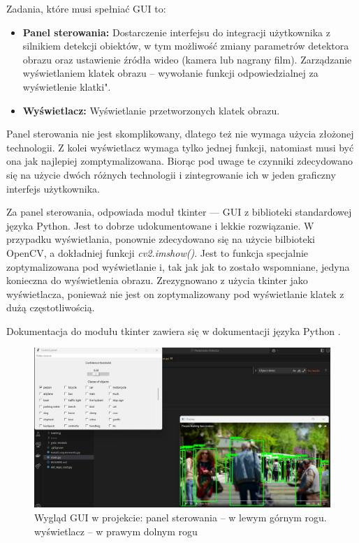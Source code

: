 Zadania, które musi spełniać GUI to:
\begin{itemize}
    \item \textbf{Panel sterowania:} Dostarczenie interfejsu do integracji użytkownika z silnikiem detekcji obiektów, w tym możliwość zmiany parametrów detektora obrazu oraz ustawienie źródła wideo (kamera lub nagrany film). Zarządzanie wyświetlaniem klatek obrazu -- wywołanie funkcji odpowiedzialnej za wyświetlenie klatki".
    \item \textbf{Wyświetlacz: } Wyświetlanie przetworzonych klatek obrazu.
\end{itemize}

Panel sterowania nie jest skomplikowany, dlatego też nie wymaga użycia złożonej technologii. Z kolei wyświetlacz wymaga tylko jednej funkcji, natomiast musi być ona jak najlepiej zomptymalizowana. Biorąc pod uwage te czynniki zdecydowano się na użycie dwóch różnych technologii i zintegrowanie ich w jeden graficzny interfejs użytkownika.

Za panel sterowania, odpowiada moduł tkinter --- GUI z biblioteki standardowej języka Python. Jest to dobrze udokumentowane i lekkie rozwiązanie. W przypadku wyświetlania, ponownie zdecydowano się na użycie bilbioteki OpenCV, a dokładniej funkcji \emph{cv2.imshow()}. Jest to funkcja specjalnie zoptymalizowana pod wyświetlanie i, tak jak jak to zostało wspomniane, jedyna konieczna do wyświetlenia obrazu.
Zrezygnowano z użycia tkinter jako wyświetlacza, ponieważ nie jest on zoptymalizowany pod wyświetlanie klatek z dużą częstotliwością. 

Dokumentacja do modułu tkinter zawiera się w dokumentacji języka Python \cite{Python_docs}.

\begin{figure}[H]
    \centering
    \includegraphics[width=\linewidth]{r_technologie/GUI_assets/mockup.jpg}
    \caption{Wygląd GUI w projekcie: panel sterowania -- w lewym górnym rogu. wyświetlacz -- w prawym dolnym rogu}
    \label{fig:technologies-GUI}
\end{figure}